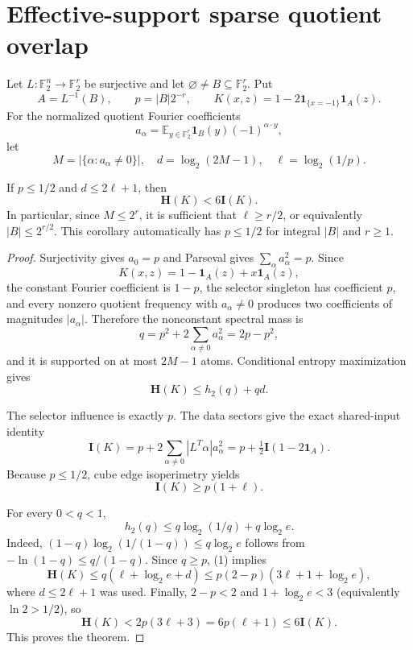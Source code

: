 \section*{Effective-support sparse quotient overlap}

Let $L:\mathbb F_2^n\to\mathbb F_2^r$ be surjective and let
$\varnothing\ne B\subseteq\mathbb F_2^r$.  Put
\[
 A=L^{-1}(B),\qquad p=|B|2^{-r},\qquad
 K(x,z)=1-2\mathbf1_{\{x=-1\}}\mathbf1_A(z).
\]
For the normalized quotient Fourier coefficients
\[
 a_\alpha=\mathbb E_{y\in\mathbb F_2^r}
   \mathbf1_B(y)(-1)^{\alpha\cdot y},
\]
let
\[
 M=|\{\alpha:a_\alpha\ne0\}|,
 \quad d=\log_2(2M-1),
 \quad \ell=\log_2(1/p).
\]

\begin{theorem}
If $p\le1/2$ and $d\le2\ell+1$, then
\[
 \mathbf H(K)<6\mathbf I(K).
\]
In particular, since $M\le2^r$, it is sufficient that
$\ell\ge r/2$, or equivalently $|B|\le2^{r/2}$.  This corollary
automatically has $p\le1/2$ for integral $|B|$ and $r\ge1$.
\end{theorem}

\begin{proof}
Surjectivity gives $a_0=p$ and Parseval gives
$\sum_\alpha a_\alpha^2=p$.  Since
\[
 K(x,z)=1-\mathbf1_A(z)+x\mathbf1_A(z),
\]
the constant Fourier coefficient is $1-p$, the selector singleton
has coefficient $p$, and every nonzero quotient frequency with
$a_\alpha\ne0$ produces two coefficients of magnitudes
$|a_\alpha|$.  Therefore the nonconstant spectral mass is
\[
 q=p^2+2\sum_{\alpha\ne0}a_\alpha^2=2p-p^2,
\]
and it is supported on at most $2M-1$ atoms.  Conditional entropy
maximization gives
\begin{equation}
 \mathbf H(K)\le h_2(q)+qd.                              \tag{1}
\end{equation}

The selector influence is exactly $p$.  The data sectors give the
exact shared-input identity
\begin{equation}
 \mathbf I(K)=p+2\sum_{\alpha\ne0}|L^T\alpha|a_\alpha^2
             =p+\tfrac12\mathbf I(1-2\mathbf1_A).        \tag{2}
\end{equation}
Because $p\le1/2$, cube edge isoperimetry yields
\begin{equation}
 \mathbf I(K)\ge p(1+\ell).                             \tag{3}
\end{equation}

For every $0<q<1$,
\[
 h_2(q)
 \le q\log_2(1/q)+q\log_2 e.
\]
Indeed,
$(1-q)\log_2(1/(1-q))\le q\log_2e$ follows from
$-\ln(1-q)\le q/(1-q)$.  Since $q\ge p$, (1) implies
\[
 \mathbf H(K)
 \le q(\ell+\log_2e+d)
 \le p(2-p)(3\ell+1+\log_2e),                           \tag{4}
\]
where $d\le2\ell+1$ was used.  Finally,
$2-p<2$ and $1+\log_2e<3$ (equivalently $\ln2>1/2$), so
\[
 \mathbf H(K)<2p(3\ell+3)=6p(\ell+1)\le6\mathbf I(K).
\]
This proves the theorem.
\end{proof}

